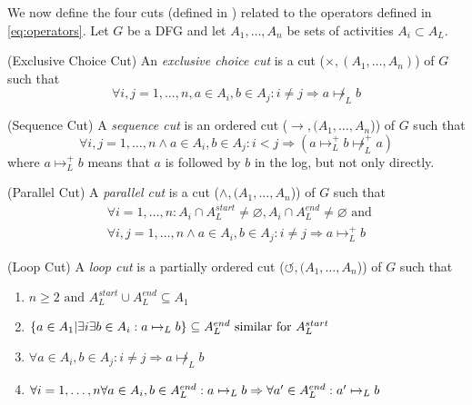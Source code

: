 \documentclass[a4paper]{IEEEtran}
\begin{document}
We now define the four cuts (defined in \cite{process_mining, inductivemining-constructive}) related to the operators defined in \ref{eq:operators}. Let $G$ be a DFG and let $A_1, \dots, A_n$ be sets of activities $A_i \subset A_L$.

\begin{defn} (Exclusive Choice Cut)
An \textit{exclusive choice cut} is a cut ($\times, (A_1, \dots, A_n)$) of $G$ such that
$$
\forall i,j = 1, \dots, n, a \in A_i, b \in A_j: i \neq j \Rightarrow a \not \mapsto_L b
$$
\end{defn}

\begin{defn} (Sequence Cut)
A \textit{sequence cut} is an ordered cut ($\rightarrow, (A_1, \dots, A_n$)) of $G$ such that
$$
\forall i,j =1,\dots, n \wedge  a \in A_i, b \in A_j: i < j \Rightarrow (a \mapsto_L^{+} b \not \mapsto^{+}_L a)
$$
where $a \mapsto_L^{+} b$ means that $a$ is followed by $b$ in the log, but not only directly. 
\end{defn}

\begin{defn} (Parallel Cut)
A \textit{parallel cut} is a cut ($\wedge,( A_1, \dots, A_n$)) of $G$ such that
\begin{align*}
&\forall i = 1,\dots, n : A_i \cap A_L^{start} \neq \varnothing, A_i \cap A_L^{end} \neq \varnothing \text{ and } \\
&\forall i,j = 1, \dots, n \wedge a \in A_i, b \in A_j : i \neq j \Rightarrow a \mapsto_L^{+} b 
\end{align*}
\end{defn}

\begin{defn} (Loop Cut)
A \textit{loop cut} is a partially ordered cut ($\circlearrowleft,( A_1, \dots, A_n$)) of $G$ such that
\begin{enumerate}
    \item $n \geq 2 \text{ and } A_L^{start} \cup A_L^{end} \subseteq A_1 $ 
    \item $ \{ a \in A_1 | \exists i \exists b \in A_i: a \mapsto_L b \} \\ \subseteq A_L^{end} \text{ similar for } A_L^{start} $
    \item $ \forall a \in A_i, b \in A_j : i \neq j \Rightarrow a \not \mapsto_L b$
    \item $ \forall i = 1, \dots, n \forall a \in A_i, b \in A_L^{end} : a \mapsto_L b \\ 
    \Rightarrow \forall a' \in A_L^{end} : a' \mapsto_L b 
    $ 
\end{enumerate}
\end{defn}
\end{document}

